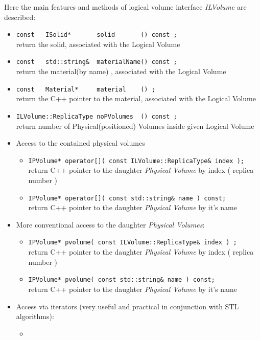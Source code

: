 Here the main features and methods of logical volume interface {\it ILVolume} are  described:
\begin{itemize}
  \item 
  \verb+const   ISolid*       solid       () const ;+
  \\ return the solid, associated with the Logical Volume  
  \item  
  \verb+const   std::string&  materialName() const ;+
  \\ return the material(by name) , associated with the Logical Volume  
  \item  
  \verb+const   Material*     material    () ;+
  \\ return the C++ pointer to the material, associated with the Logical Volume  
 \item
  \verb+ILVolume::ReplicaType noPVolumes  () const ;+
  \\ return number of Physical(positioned) Volumes inside given Logical Volume
\item Access to the contained physical volumes 
\begin{itemize} 
\item 
{\tt IPVolume* operator[]( const ILVolume::ReplicaType\& index );}
 \\ return C++ pointer to the daughter {\it Physical Volume} by index ( replica number )
\item 
\verb+IPVolume* operator[]( const std::string& name ) const;+
 \\ return C++ pointer to the daughter {\it Physical Volume}  by it's name
\end{itemize} 	
\item More conventional access to the daughter {\it Physical Volumes}:
\begin{itemize} 	
\item 
{\tt IPVolume* pvolume( const ILVolume::ReplicaType\& index ) ;}
  \\ return C++ pointer to the daughter {\it Physical Volume} by index ( replica number )
\item
{\tt IPVolume* pvolume( const std::string\& name ) const;}
  \\ return C++ pointer to the daughter {\it Physical Volume} by it's name 
\end{itemize} 
  \item Access via iterators (very useful and practical in conjunction with STL algorithms):
 \begin{itemize} 
 \item 

\end{itemize}
\end{itemize}
